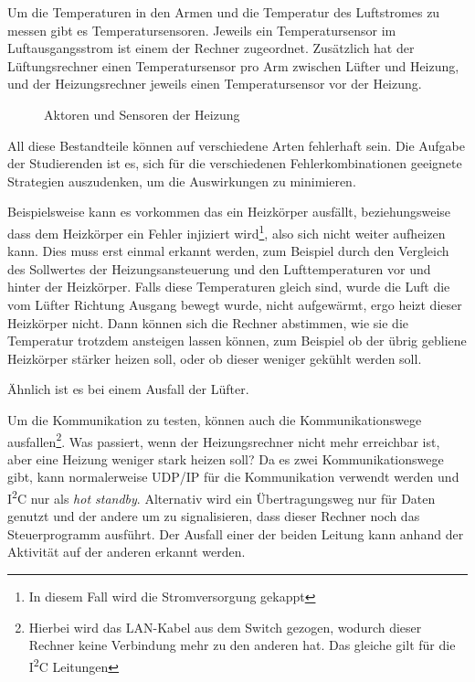 Um die Temperaturen in den Armen und die Temperatur des Luftstromes zu messen gibt es Temperatursensoren. Jeweils ein Temperatursensor im Luftausgangsstrom ist einem
der Rechner zugeordnet. Zus{\"{a}}tzlich hat der L{\"{u}}ftungsrechner einen Temperatursensor pro Arm zwischen L{\"{u}}fter und Heizung, und der Heizungsrechner jeweils
einen Temperatursensor vor der Heizung.

\begin{figure}
	\centering
	\caption{Aktoren und Sensoren der Heizung}
	\label{fig:heizunghw}
\end{figure}

All diese Bestandteile k{\"{o}}nnen auf verschiedene Arten fehlerhaft sein. Die Aufgabe der Studierenden
ist es, sich f{\"{u}}r die verschiedenen Fehlerkombinationen
geeignete Strategien auszudenken, um die Auswirkungen zu minimieren.

Beispielsweise kann es vorkommen das ein Heizk{\"{o}}rper ausf{\"{a}}llt, beziehungsweise dass dem
Heizk{\"{o}}rper ein Fehler injiziert wird\footnote{In diesem Fall wird die Stromversorgung gekappt},
also sich nicht weiter aufheizen kann. Dies muss erst einmal erkannt werden, zum Beispiel
durch den Vergleich des Sollwertes der Heizungsansteuerung und den Lufttemperaturen vor und hinter der Heizk{\"{o}}rper. Falls diese Temperaturen gleich sind,
wurde die Luft die vom L{\"{u}}fter Richtung Ausgang bewegt wurde, nicht aufgew{\"{a}}rmt, ergo heizt dieser Heizk{\"{o}}rper nicht. Dann k{\"{o}}nnen sich die
Rechner abstimmen, wie sie die Temperatur trotzdem ansteigen lassen k{\"{o}}nnen, zum Beispiel ob der {\"{u}}brig gebliene Heizk{\"{o}}rper st{\"{a}}rker heizen
soll, oder ob dieser weniger gek{\"{u}}hlt werden soll.

{\"{A}}hnlich ist es bei einem Ausfall der L{\"{u}}fter. 

Um die Kommunikation zu testen, k{\"{o}}nnen auch die Kommunikationswege ausfallen\footnote{Hierbei
wird das LAN-Kabel aus dem Switch gezogen, wodurch dieser Rechner keine Verbindung mehr zu den anderen hat.
Das gleiche gilt f{\"{u}}r die I\textsuperscript{2}C Leitungen}.
Was passiert, wenn der Heizungsrechner nicht mehr erreichbar ist, aber eine Heizung weniger stark heizen soll?
Da es zwei Kommunikationswege gibt, kann normalerweise UDP/IP f{\"{u}}r die Kommunikation verwendt werden
und I\textsuperscript{2}C nur als \textit{hot standby}. Alternativ wird ein {\"{U}}bertragungsweg nur
f{\"{u}}r Daten genutzt und der andere um zu signalisieren, dass dieser Rechner noch das
Steuerprogramm ausf{\"{u}}hrt. Der Ausfall einer der beiden Leitung kann anhand der Aktivit{\"{a}}t auf der
anderen erkannt werden.

